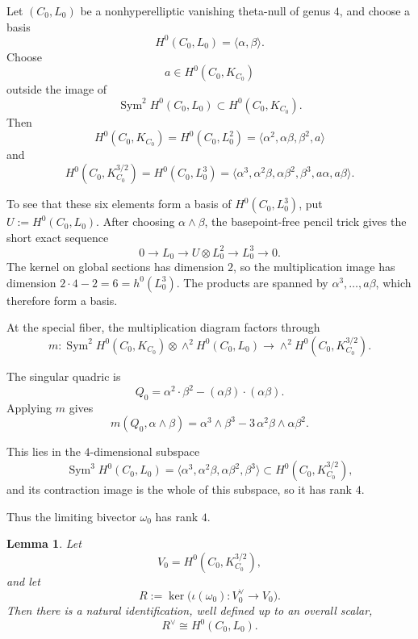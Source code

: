 \documentclass[11pt]{article}
\newtheorem{lemma}[theorem]{Lemma}
\newcommand{\Sym}{\operatorname{Sym}}
\begin{document}
Let $(C_0,L_0)$ be a {nonhyperelliptic} vanishing theta-null of genus $4$, and choose a basis
\[
H^0(C_0,L_0)=\langle \alpha,\beta\rangle.
\]
Choose
\[
a\in H^0(C_0,K_{C_0})
\]
outside the image of
\[
\Sym^2 H^0(C_0,L_0)\subset H^0(C_0,K_{C_0}).
\]
Then
\[
H^0(C_0,K_{C_0})= H^0(C_0,L_0^2) = \langle \alpha^2,\alpha\beta,\beta^2,a\rangle
\]
and
\[
H^0(C_0,K_{C_0}^{3/2})
=  H^0(C_0,L_0^3) =
\langle \alpha^3,\alpha^2\beta,\alpha\beta^2,\beta^3,a\alpha,a\beta\rangle.
\]

\begingroup
{To see that these six elements form a basis of $H^0(C_0,L_0^3)$,
put $U:=H^0(C_0,L_0)$. After choosing $\alpha\wedge\beta$,
the basepoint-free pencil trick gives the short exact sequence}
\[
0\longrightarrow L_0\longrightarrow U\otimes L_0^2
\longrightarrow L_0^3\longrightarrow0.
\]
The kernel on global sections has dimension $2$, so the multiplication
image has dimension $2\cdot4-2=6=h^0(L_0^3)$.
{The products are spanned by $\alpha^3, \dots, a\beta$, which therefore form a basis.}
\endgroup

At the special fiber, the multiplication diagram factors through
\begin{equation}
m:\Sym^2 H^0(C_0,K_{C_0})\otimes \wedge^2 H^0(C_0,L_0)
\longrightarrow
\wedge^2 H^0(C_0,K_{C_0}^{3/2}).
\end{equation}

The singular quadric is
\[
Q_0=\alpha^2\cdot\beta^2-(\alpha\beta)\cdot(\alpha\beta).
\]
Applying $m$ gives
\begin{equation}
m(Q_0,\alpha\wedge\beta)
=
\alpha^3\wedge\beta^3-3\,\alpha^2\beta\wedge \alpha\beta^2.
\end{equation}

This lies in the $4$-dimensional subspace
\[
\Sym^3 H^0(C_0,L_0)
=
\langle \alpha^3,\alpha^2\beta,\alpha\beta^2,\beta^3\rangle
\subset H^0(C_0,K_{C_0}^{3/2}),
\]
and its contraction image is the whole of this subspace, so it has rank $4$.

Thus the limiting bivector $\omega_0$ has rank $4$.

\begin{lemma}\label{lem:Rdual}
Let
\[
V_0=H^0(C_0,K_{C_0}^{3/2}),
\]
and let
\[
R:=\ker\bigl(\iota(\omega_0):V_0^\vee\to V_0\bigr).
\]
Then there is a natural identification, well defined up to an overall scalar,
\[
R^\vee \cong H^0(C_0,L_0).
\]
\end{lemma}
\end{document}
